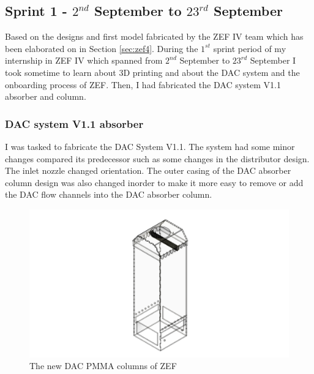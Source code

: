 \subsection{Sprint 1 - $2^{nd}$ September to $23^{rd}$ September}

Based on the designs and first model fabricated by the ZEF IV team which has been elaborated on in Section \ref{sec:zef4}. During the $1^{st}$ sprint period of my internship in ZEF IV which spanned from $2^{nd}$ September to $23^{rd}$ September I took sometime to learn about 3D printing and about the DAC system and the onboarding process of ZEF. Then, I had fabricated the DAC system V1.1 absorber and column.  

\subsubsection{DAC system V1.1 absorber}
\label{sec:sprint1}

I was tasked to fabricate the DAC System V1.1. The system had some minor changes compared its predecessor such as some changes in the distributor design. The inlet nozzle changed orientation. The outer casing of the DAC absorber column design was also changed inorder to make it more easy to remove or add the DAC flow channels into the DAC absorber column. 
\bigbreak

\begin{figure}[H]
    \centering
    \includegraphics[scale = 0.4]{images/mywork/Sprint1/Column.png}
    \caption{The new DAC PMMA columns of ZEF}
    \label{fig:daccolumn}
\end{figure}

